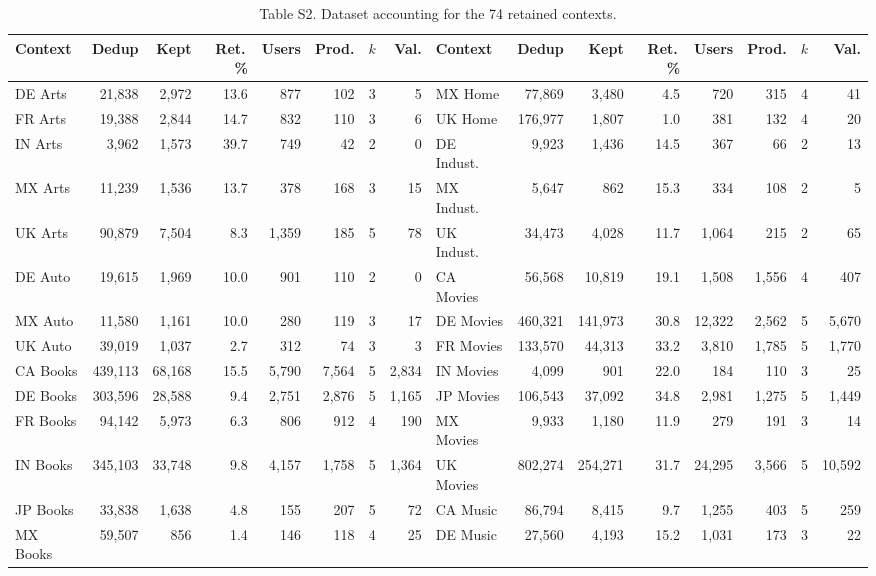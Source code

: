 \begin{table}[H]
\caption{Table S2. Dataset accounting for the 74 retained contexts.}
\centering\scriptsize\setlength{\tabcolsep}{2.6pt}
\begin{tabular}{lrrrrrcr@{\hspace{10pt}}lrrrrrcr}
\toprule
Context & Dedup & Kept & Ret.\,\% & Users & Prod. & $k$ & Val. & Context & Dedup & Kept & Ret.\,\% & Users & Prod. & $k$ & Val. \\
\midrule
DE Arts & 21,838 & 2,972 & 13.6 & 877 & 102 & 3 & 5 & MX Home & 77,869 & 3,480 & 4.5 & 720 & 315 & 4 & 41 \\
FR Arts & 19,388 & 2,844 & 14.7 & 832 & 110 & 3 & 6 & UK Home & 176,977 & 1,807 & 1.0 & 381 & 132 & 4 & 20 \\
IN Arts & 3,962 & 1,573 & 39.7 & 749 & 42 & 2 & 0 & DE Indust. & 9,923 & 1,436 & 14.5 & 367 & 66 & 2 & 13 \\
MX Arts & 11,239 & 1,536 & 13.7 & 378 & 168 & 3 & 15 & MX Indust. & 5,647 & 862 & 15.3 & 334 & 108 & 2 & 5 \\
UK Arts & 90,879 & 7,504 & 8.3 & 1,359 & 185 & 5 & 78 & UK Indust. & 34,473 & 4,028 & 11.7 & 1,064 & 215 & 2 & 65 \\
DE Auto & 19,615 & 1,969 & 10.0 & 901 & 110 & 2 & 0 & CA Movies & 56,568 & 10,819 & 19.1 & 1,508 & 1,556 & 4 & 407 \\
MX Auto & 11,580 & 1,161 & 10.0 & 280 & 119 & 3 & 17 & DE Movies & 460,321 & 141,973 & 30.8 & 12,322 & 2,562 & 5 & 5,670 \\
UK Auto & 39,019 & 1,037 & 2.7 & 312 & 74 & 3 & 3 & FR Movies & 133,570 & 44,313 & 33.2 & 3,810 & 1,785 & 5 & 1,770 \\
CA Books & 439,113 & 68,168 & 15.5 & 5,790 & 7,564 & 5 & 2,834 & IN Movies & 4,099 & 901 & 22.0 & 184 & 110 & 3 & 25 \\
DE Books & 303,596 & 28,588 & 9.4 & 2,751 & 2,876 & 5 & 1,165 & JP Movies & 106,543 & 37,092 & 34.8 & 2,981 & 1,275 & 5 & 1,449 \\
FR Books & 94,142 & 5,973 & 6.3 & 806 & 912 & 4 & 190 & MX Movies & 9,933 & 1,180 & 11.9 & 279 & 191 & 3 & 14 \\
IN Books & 345,103 & 33,748 & 9.8 & 4,157 & 1,758 & 5 & 1,364 & UK Movies & 802,274 & 254,271 & 31.7 & 24,295 & 3,566 & 5 & 10,592 \\
JP Books & 33,838 & 1,638 & 4.8 & 155 & 207 & 5 & 72 & CA Music & 86,794 & 8,415 & 9.7 & 1,255 & 403 & 5 & 259 \\
MX Books & 59,507 & 856 & 1.4 & 146 & 118 & 4 & 25 & DE Music & 27,560 & 4,193 & 15.2 & 1,031 & 173 & 3 & 22 \\

\end{tabular}
\end{table}
